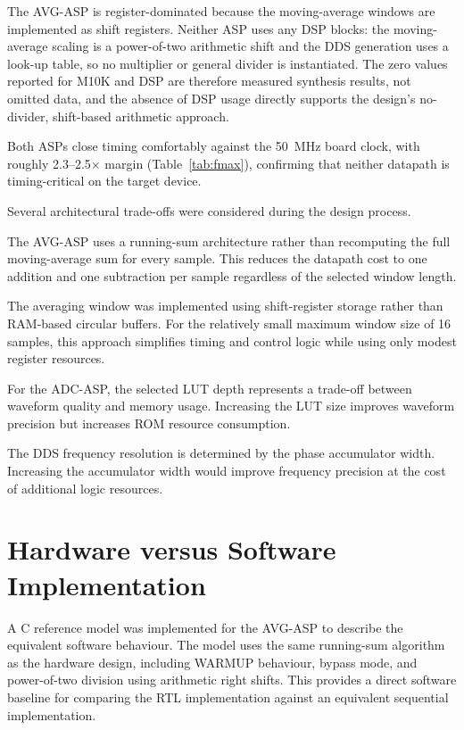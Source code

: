 \documentclass[10pt, a4paper]{article}
\begin{document}
The AVG-ASP is register-dominated because the moving-average windows are implemented as shift registers. Neither ASP uses any DSP blocks: the moving-average scaling is a power-of-two arithmetic shift and the DDS generation uses a look-up table, so no multiplier or general divider is instantiated. The zero values reported for M10K and DSP are therefore measured synthesis results, not omitted data, and the absence of DSP usage directly supports the design's no-divider, shift-based arithmetic approach.

Both ASPs close timing comfortably against the 50~MHz board clock, with roughly 2.3--2.5$\times$ margin (Table~\ref{tab:fmax}), confirming that neither datapath is timing-critical on the target device.

Several architectural trade-offs were considered during the design process.

The AVG-ASP uses a running-sum architecture rather than recomputing the full moving-average sum for every sample. This reduces the datapath cost to one addition and one subtraction per sample regardless of the selected window length.

The averaging window was implemented using shift-register storage rather than RAM-based circular buffers. For the relatively small maximum window size of 16 samples, this approach simplifies timing and control logic while using only modest register resources.

For the ADC-ASP, the selected LUT depth represents a trade-off between waveform quality and memory usage. Increasing the LUT size improves waveform precision but increases ROM resource consumption.

The DDS frequency resolution is determined by the phase accumulator width. Increasing the accumulator width would improve frequency precision at the cost of additional logic resources.

\section{Hardware versus Software Implementation}
\label{sec:performance_discussion}

A C reference model was implemented for the AVG-ASP to describe the equivalent software behaviour. The model uses the same running-sum algorithm as the hardware design, including WARMUP behaviour, bypass mode, and power-of-two division using arithmetic right shifts. This provides a direct software baseline for comparing the RTL implementation against an equivalent sequential implementation.
\end{document}
